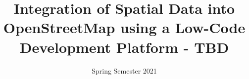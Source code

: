 \title  {Integration of Spatial Data into OpenStreetMap using a Low-Code Development Platform - TBD}
\addresses  {\groupname\\\deptname\\\univname} 
\date       {Spring Semester 2021}

\maketitle